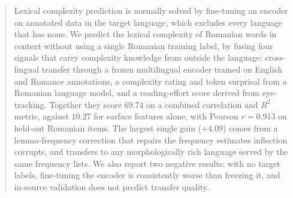 %

\begin{abstract}
Lexical complexity prediction is normally solved by fine-tuning an
encoder on annotated data in the target language, which excludes every
language that has none. We predict the lexical complexity of Romanian
words in context without using a single Romanian training label, by
fusing four signals that carry complexity knowledge from outside the
language: cross-lingual transfer through a frozen multilingual encoder
trained on English and Romance annotations, a complexity rating and
token surprisal from a Romanian language model, and a reading-effort
score derived from eye-tracking. Together they score $69.74$ on a
combined correlation and $R^2$ metric, against $10.27$ for surface
features alone, with Pearson $r = 0.913$ on held-out Romanian items.
The largest single gain
($+4.09$) comes from a lemma-frequency correction that repairs the
frequency estimates inflection corrupts, and transfers to any
morphologically rich language served by the same frequency lists. We
also report two negative results: with no target labels, fine-tuning
the encoder is consistently worse than freezing it, and in-source
validation does not predict transfer quality.
\end{abstract}

